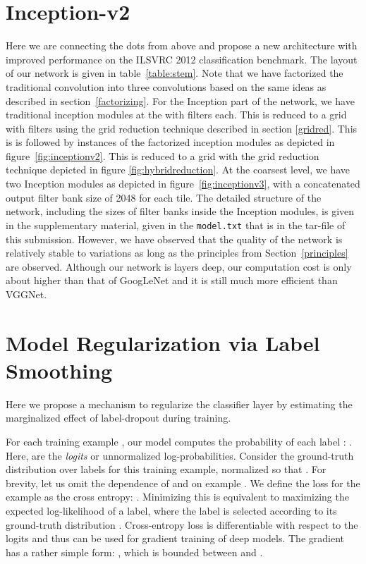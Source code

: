 \documentclass[10pt,twocolumn,letterpaper]{article}
\begin{document}
\section{Inception-v2}
\label{revisited}
Here we are connecting the dots from above and propose a new
architecture with improved performance on the ILSVRC 2012
classification benchmark.
The layout of our network is given in table~\ref{table:stem}.
Note that we have factorized the traditional  convolution into
three  convolutions based on the same ideas as described in
section~\ref{factorizing}.
For the Inception part of the network, we have  traditional
inception modules at  the  with  filters each.
This is reduced to a  grid with  filters using the
grid reduction technique described in section \ref{gridred}. This is
is followed by  instances of the factorized inception modules as
depicted in figure~\ref{fig:inceptionv2}. This is reduced to a 
grid with the grid reduction technique depicted in figure \ref{fig:hybridreduction}.
At the coarsest  level, we have two Inception modules as depicted
in figure~\ref{fig:inceptionv3}, with a concatenated output filter bank size of
2048 for each tile. The detailed structure of the
network, including the sizes of filter banks inside the Inception modules,
is given in the supplementary material, given in the {\tt model.txt} that is in
the tar-file of this submission. However, we have observed that
the quality of the network is relatively stable to variations
as long as the principles from Section~\ref{principles} are observed.
Although our network is  layers deep, our computation cost is only
about  higher than that of GoogLeNet and it is still much more efficient than
VGGNet.

 \section{Model Regularization via Label Smoothing}
\label{smoothing}
Here we propose a mechanism to regularize the classifier layer by
estimating the marginalized effect of label-dropout during training.

For each training example , our model computes the probability of each label
: . Here,
 are the {\em logits} or unnormalized log-probabilities. Consider the
ground-truth distribution over labels  for this training example,
normalized so that . For brevity, let us omit the dependence
of  and  on example . We define the loss for the example as the
cross entropy: . Minimizing this is
equivalent to maximizing the expected log-likelihood of a label, where the label
is selected according to its ground-truth distribution . Cross-entropy
loss is differentiable with respect to the logits  and thus can be used for
gradient training of deep models. The gradient has a rather simple form:
, which is bounded between 
and .
\end{document}
